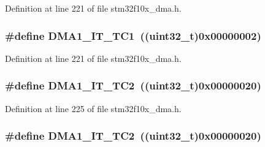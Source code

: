 Definition at line 221 of file stm32f10x\+\_\+dma.\+h.

\subsubsection[{\texorpdfstring{D\+M\+A1\+\_\+\+I\+T\+\_\+\+T\+C1}{DMA1_IT_TC1}}]{\setlength{\rightskip}{0pt plus 5cm}\#define D\+M\+A1\+\_\+\+I\+T\+\_\+\+T\+C1~(({\bf uint32\+\_\+t})0x00000002)}\hypertarget{group___d_m_a__interrupts__definition_ga783532083dcc6e9752feb2e982ce7426}{}\label{group___d_m_a__interrupts__definition_ga783532083dcc6e9752feb2e982ce7426}


Definition at line 221 of file stm32f10x\+\_\+dma.\+h.

\subsubsection[{\texorpdfstring{D\+M\+A1\+\_\+\+I\+T\+\_\+\+T\+C2}{DMA1_IT_TC2}}]{\setlength{\rightskip}{0pt plus 5cm}\#define D\+M\+A1\+\_\+\+I\+T\+\_\+\+T\+C2~(({\bf uint32\+\_\+t})0x00000020)}\hypertarget{group___d_m_a__interrupts__definition_ga14171253268d69143102594cde56b0e1}{}\label{group___d_m_a__interrupts__definition_ga14171253268d69143102594cde56b0e1}


Definition at line 225 of file stm32f10x\+\_\+dma.\+h.

\subsubsection[{\texorpdfstring{D\+M\+A1\+\_\+\+I\+T\+\_\+\+T\+C2}{DMA1_IT_TC2}}]{\setlength{\rightskip}{0pt plus 5cm}\#define D\+M\+A1\+\_\+\+I\+T\+\_\+\+T\+C2~(({\bf uint32\+\_\+t})0x00000020)}\hypertarget{group___d_m_a__interrupts__definition_ga14171253268d69143102594cde56b0e1}{}\label{group___d_m_a__interrupts__definition_ga14171253268d69143102594cde56b0e1}


